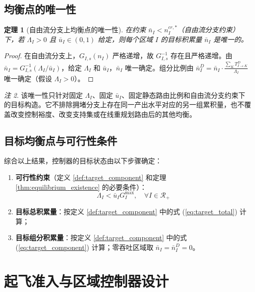 \documentclass[a4paper,12pt]{article}
\theoremstyle{plain}
\newtheorem{theorem}{定理}[section]
\theoremstyle{definition}
\theoremstyle{remark}
\newtheorem{remark}[theorem]{注}
\begin{document}
\subsection{均衡点的唯一性}

\begin{theorem}[自由流分支上均衡点的唯一性]\label{thm:equilibrium_uniqueness}
在约束 $\bar{n}_I < n_I^{cr,*}$（自由流分支约束）下，若 $\Lambda_I > 0$ 且 $\bar u_I\in(0,1)$ 给定，则每个区域 $I$ 的目标积累量 $\bar{n}_I$ 是唯一的。
\end{theorem}

\begin{proof}
在自由流分支上，$G_{I,s}(n_I)$ 严格递增，故 $G_{I,s}^{-1}$ 存在且严格递增。由 $\bar{n}_I = G_{I,s}^{-1}(\Lambda_I/\bar u_I)$，给定 $\Lambda_I$ 和 $\bar u_I$，$\bar{n}_I$ 唯一确定。组分比例由 $\bar{n}_I^D = \bar{n}_I \cdot \frac{\sum_K T_{I \to K}^D}{\Lambda_I}$ 唯一确定（假设 $\Lambda_I > 0$）。
\end{proof}

\begin{remark}
该唯一性只针对固定 $\Lambda_I$、固定 $\bar u_I$、固定静态路由比例和自由流分支约束下的目标构造。它不排除拥堵分支上存在同一产出水平对应的另一组累积量，也不覆盖改变控制裕度、改变支持集或在线重规划路由后的其他均衡。
\end{remark}

\subsection{目标均衡点与可行性条件}

综合以上结果，控制器的目标状态由以下步骤确定：
\begin{enumerate}
    \item \textbf{可行性约束}（定义 \ref{def:target_component} 和定理 \ref{thm:equilibrium_existence} 的必要条件）：
    \begin{equation} \label{eq:feasibility}
        \Lambda_I < \bar u_I G_I^{\max}, \quad \forall I \in \mathcal{R}_+
    \end{equation}
    \item \textbf{目标总积累量}：按定义 \ref{def:target_component} 中的式 (\ref{eq:target_total}) 计算；
    \item \textbf{目标组分积累量}：按定义 \ref{def:target_component} 中的式 (\ref{eq:target_component}) 计算；零吞吐区域取 $\bar n_I=\bar n_I^D=0$。
\end{enumerate}

\section{起飞准入与区域控制器设计}\label{sec:controller}
\end{document}
